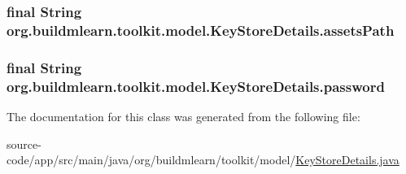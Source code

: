 \subsubsection[{\texorpdfstring{assets\+Path}{assetsPath}}]{\setlength{\rightskip}{0pt plus 5cm}final String org.\+buildmlearn.\+toolkit.\+model.\+Key\+Store\+Details.\+assets\+Path\hspace{0.3cm}{\ttfamily [private]}}\hypertarget{classorg_1_1buildmlearn_1_1toolkit_1_1model_1_1KeyStoreDetails_a26f2d156f1f6cf648048c260764e8b1d}{}\label{classorg_1_1buildmlearn_1_1toolkit_1_1model_1_1KeyStoreDetails_a26f2d156f1f6cf648048c260764e8b1d}
\subsubsection[{\texorpdfstring{password}{password}}]{\setlength{\rightskip}{0pt plus 5cm}final String org.\+buildmlearn.\+toolkit.\+model.\+Key\+Store\+Details.\+password\hspace{0.3cm}{\ttfamily [private]}}\hypertarget{classorg_1_1buildmlearn_1_1toolkit_1_1model_1_1KeyStoreDetails_ae138d2646a7d55dad251cdeee6a62200}{}\label{classorg_1_1buildmlearn_1_1toolkit_1_1model_1_1KeyStoreDetails_ae138d2646a7d55dad251cdeee6a62200}


The documentation for this class was generated from the following file\+:\begin{DoxyCompactItemize}
\item 
source-\/code/app/src/main/java/org/buildmlearn/toolkit/model/\hyperlink{KeyStoreDetails_8java}{Key\+Store\+Details.\+java}\end{DoxyCompactItemize}
